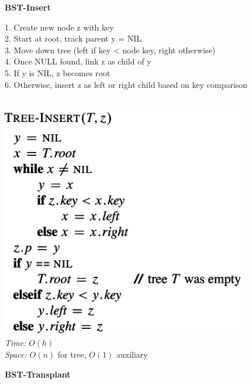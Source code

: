 {\begin{minipage}[t]{1\textwidth}
\begin{minipage}[t]{0.19\textwidth}
\begin{minipage}[t]{1.6\textwidth}
\begin{itemize}
            \end{itemize}
        \end{minipage}
    \end{minipage}
    \hfill
    \begin{minipage}[t]{0.19\textwidth}
        \centering
        \textbf{\scriptsize BST-Insert}\\[2pt]
       \tiny
        \begin{minipage}[t]{\textwidth}
           \tiny
            1. Create new node z with key\\
            2. Start at root, track parent y = NIL\\
            3. Move down tree (left if key < node key, right otherwise)\\
            4. Once NULL found, link z as child of y\\
            5. If y is NIL, z becomes root\\
            6. Otherwise, insert z as left or right child based on key comparison
        \end{minipage}\\[4pt]
        \includegraphics[width=0.8\textwidth]{images/bst-insert.png}\\[2pt]
        \textit{Time:} \(O(h)\)\\
        \textit{Space:} \(O(n)\) for tree, \(O(1)\) auxiliary
    \end{minipage}
    \hfill
    \begin{minipage}[t]{0.19\textwidth}
        \centering
        \textbf{\scriptsize BST-Transplant}\\[2pt]

\end{minipage}
\end{minipage}}

